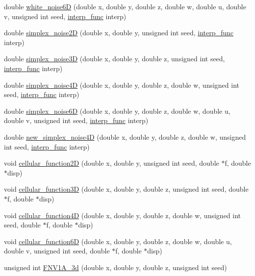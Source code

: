 \begin{DoxyCompactItemize}
\item 
double \hyperlink{namespaceanl_a475918080d70d295888ca405a82b5435}{white\_\-noise6D} (double x, double y, double z, double w, double u, double v, unsigned int seed, \hyperlink{namespaceanl_a2c8cd5d25499b47ef49c82dea75ba8dd}{interp\_\-func} interp)
\item 
double \hyperlink{namespaceanl_a14a7ed5f51db5b1b83aa301e2bdf0a4a}{simplex\_\-noise2D} (double x, double y, unsigned int seed, \hyperlink{namespaceanl_a2c8cd5d25499b47ef49c82dea75ba8dd}{interp\_\-func} interp)
\item 
double \hyperlink{namespaceanl_a60bd7840a2e23a6a799aa532115b9a01}{simplex\_\-noise3D} (double x, double y, double z, unsigned int seed, \hyperlink{namespaceanl_a2c8cd5d25499b47ef49c82dea75ba8dd}{interp\_\-func} interp)
\item 
double \hyperlink{namespaceanl_ab7eda71be575c2dd3ffd3ca3b220cf69}{simplex\_\-noise4D} (double x, double y, double z, double w, unsigned int seed, \hyperlink{namespaceanl_a2c8cd5d25499b47ef49c82dea75ba8dd}{interp\_\-func} interp)
\item 
double \hyperlink{namespaceanl_a864d63fa207aa567d03fe09cc13b7d10}{simplex\_\-noise6D} (double x, double y, double z, double w, double u, double v, unsigned int seed, \hyperlink{namespaceanl_a2c8cd5d25499b47ef49c82dea75ba8dd}{interp\_\-func} interp)
\item 
double \hyperlink{namespaceanl_a652dc6981a12418072f970563ada7af1}{new\_\-simplex\_\-noise4D} (double x, double y, double z, double w, unsigned int seed, \hyperlink{namespaceanl_a2c8cd5d25499b47ef49c82dea75ba8dd}{interp\_\-func} interp)
\item 
void \hyperlink{namespaceanl_a19e0b5ad2aac87e007cd0979ca0320d0}{cellular\_\-function2D} (double x, double y, unsigned int seed, double $\ast$f, double $\ast$disp)
\item 
void \hyperlink{namespaceanl_a6dba94663a355d7422d19c16382ff415}{cellular\_\-function3D} (double x, double y, double z, unsigned int seed, double $\ast$f, double $\ast$disp)
\item 
void \hyperlink{namespaceanl_a434301b07bb093858c319d4cfb3c7a06}{cellular\_\-function4D} (double x, double y, double z, double w, unsigned int seed, double $\ast$f, double $\ast$disp)
\item 
void \hyperlink{namespaceanl_a6dff2151ef31b675e2f7571fec43457f}{cellular\_\-function6D} (double x, double y, double z, double w, double u, double v, unsigned int seed, double $\ast$f, double $\ast$disp)
\item 
unsigned int \hyperlink{namespaceanl_abd12e744f21b4679a551c6a08de278cb}{FNV1A\_\-3d} (double x, double y, double z, unsigned int seed)
\end{DoxyCompactItemize}

